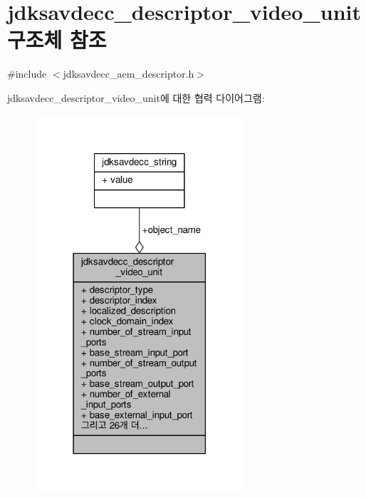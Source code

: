 \hypertarget{structjdksavdecc__descriptor__video__unit}{}\section{jdksavdecc\+\_\+descriptor\+\_\+video\+\_\+unit 구조체 참조}
\label{structjdksavdecc__descriptor__video__unit}


{\ttfamily \#include $<$jdksavdecc\+\_\+aem\+\_\+descriptor.\+h$>$}



jdksavdecc\+\_\+descriptor\+\_\+video\+\_\+unit에 대한 협력 다이어그램\+:
\nopagebreak
\begin{figure}[H]
\begin{center}
\leavevmode
\includegraphics[width=219pt]{structjdksavdecc__descriptor__video__unit__coll__graph}
\end{center}
\end{figure}
